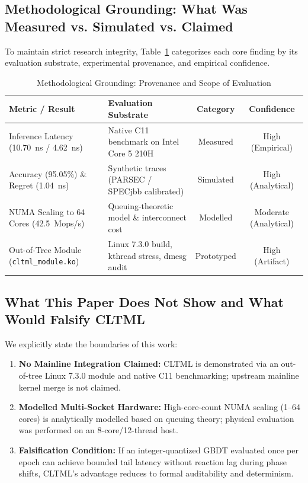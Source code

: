 \documentclass[conference]{IEEEtran}
\begin{document}
\subsection{Methodological Grounding: What Was Measured vs. Simulated vs. Claimed}
To maintain strict research integrity, Table~\ref{tab:grounding} categorizes each core finding by its evaluation substrate, experimental provenance, and empirical confidence.

\begin{table}[t]
\centering
\caption{Methodological Grounding: Provenance and Scope of Evaluation}
\label{tab:grounding}
\begin{tabular}{p{2.3cm}p{2.2cm}cc}
\toprule
\textbf{Metric / Result} & \textbf{Evaluation Substrate} & \textbf{Category} & \textbf{Confidence} \\
\midrule
Inference Latency (10.70~ns / 4.62~ns) & Native C11 benchmark on Intel Core 5 210H & Measured & High (Empirical) \\
Accuracy (95.05\%) \& Regret (1.04~ns) & Synthetic traces (PARSEC / SPECjbb calibrated) & Simulated & High (Analytical) \\
NUMA Scaling to 64 Cores (42.5~Mops/s) & Queuing-theoretic model \& interconnect cost & Modelled & Moderate (Analytical) \\
Out-of-Tree Module (\texttt{cltml\_module.ko}) & Linux 7.3.0 build, kthread stress, dmesg audit & Prototyped & High (Artifact) \\
\bottomrule
\end{tabular}
\end{table}

\subsection{What This Paper Does Not Show and What Would Falsify CLTML}
We explicitly state the boundaries of this work:
\begin{enumerate}
    \item \textbf{No Mainline Integration Claimed:} CLTML is demonstrated via an out-of-tree Linux 7.3.0 module and native C11 benchmarking; upstream mainline kernel merge is not claimed.
    \item \textbf{Modelled Multi-Socket Hardware:} High-core-count NUMA scaling (1--64 cores) is analytically modelled based on queuing theory; physical evaluation was performed on an 8-core/12-thread host.
    \item \textbf{Falsification Condition:} If an integer-quantized GBDT evaluated once per epoch can achieve bounded tail latency without reaction lag during phase shifts, CLTML's advantage reduces to formal auditability and determinism.
\end{enumerate}
\end{document}
